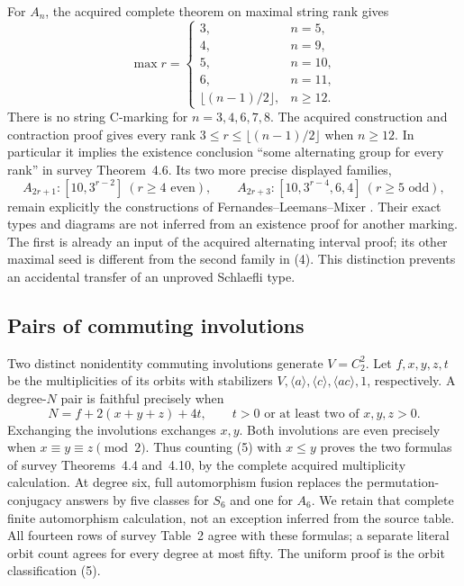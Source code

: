 \documentclass[11pt]{article}
\newcommand{\gen}[1]{\langle#1\rangle}
\newcommand{\note}[1]{\marginpar{\raggedright\scriptsize #1}}
\begin{document}
For $A_n$, the acquired complete theorem on maximal string rank gives
\[
 \max r=\begin{cases}
 3,&n=5,\\4,&n=9,\\5,&n=10,\\6,&n=11,\\
 \lfloor(n-1)/2\rfloor,&n\ge12.
 \end{cases}                                                   \tag{3}
\]
There is no string C-marking for $n=3,4,6,7,8$. The acquired construction
and contraction proof gives every rank $3\le r\le\lfloor(n-1)/2\rfloor$
when $n\ge12$. In particular it implies the existence conclusion
``some alternating group for every rank'' in survey Theorem~4.6.
Its two more precise displayed families,
\[
 A_{2r+1}:[10,3^{r-2}]\ (r\ge4\text{ even}),\qquad
 A_{2r+3}:[10,3^{r-4},6,4]\ (r\ge5\text{ odd}),                \tag{4}
\]
remain explicitly the constructions of Fernandes--Leemans--Mixer
\cite{alt2012}. Their exact types and diagrams are not inferred from
an existence proof for another marking. The first is already an input
of the acquired alternating interval proof; its other maximal seed
is different from the second family in (4). This distinction prevents
an accidental transfer of an unproved Schlaefli type.

\subsection*{Pairs of commuting involutions}
\note{Reuse}
Two distinct nonidentity commuting involutions generate $V=C_2^2$.
Let $f,x,y,z,t$ be the multiplicities of its orbits with stabilizers
$V,\gen a,\gen c,\gen{ac},1$, respectively. A degree-$N$ pair is
faithful precisely when
\[
 N=f+2(x+y+z)+4t,\qquad t>0\text{ or at least two of }x,y,z>0.    \tag{5}
\]
Exchanging the involutions exchanges $x,y$. Both involutions are even
precisely when $x\equiv y\equiv z\pmod2$. Thus counting (5) with
$x\le y$ proves the two formulas of survey Theorems~4.4 and~4.10,
by the complete acquired multiplicity calculation. At degree six,
full automorphism fusion replaces the permutation-conjugacy answers
by five classes for $S_6$ and one for $A_6$. We retain that complete
finite automorphism calculation, not an exception inferred from the
source table. All fourteen rows of survey Table~2 agree with these
formulas; a separate literal orbit count agrees for every degree at
most fifty. The uniform proof is the orbit classification (5).
\end{document}
